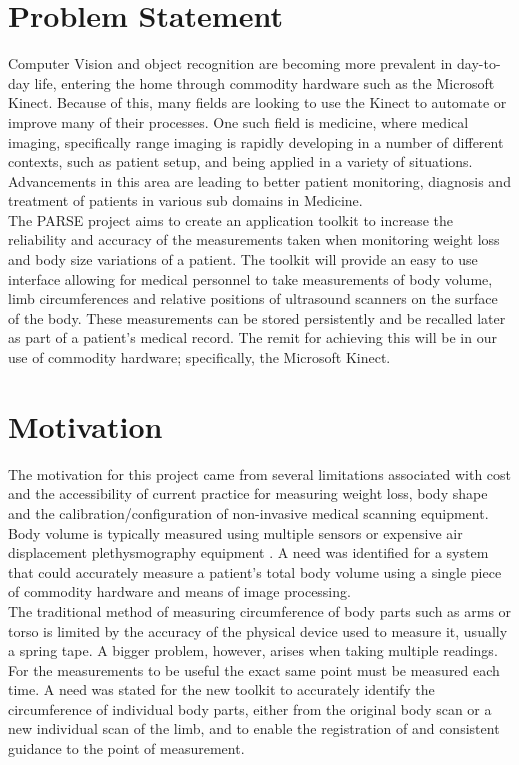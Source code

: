 \section{Problem Statement}
\label{spec: problem statement}
Computer Vision and object recognition are becoming more prevalent in day-to-day life, entering the home through commodity hardware such as the Microsoft Kinect. Because of this, many fields are looking to use the Kinect to automate or improve many of their processes. One such field is medicine, where medical imaging, specifically range imaging is rapidly developing in a number of different contexts, such as patient setup, and being applied in a variety of situations. Advancements in this area are leading to better patient monitoring, diagnosis and treatment of patients in various sub domains in Medicine.\\  

The PARSE project aims to create an application toolkit to increase the reliability and accuracy of the measurements taken when monitoring weight loss and body size variations of a patient. The toolkit will provide an easy to use interface allowing for medical personnel to take measurements of body volume, limb circumferences and relative positions of ultrasound scanners on the surface of the body. These measurements can be stored persistently and be recalled later as part of a patient’s medical record. The remit for achieving this will be in our use of commodity hardware; specifically, the Microsoft Kinect.\\ 

\section{Motivation}
\label{spec:motivation}
The motivation for this project came from several limitations associated with cost and the accessibility of current practice for measuring weight loss, body shape and the calibration/configuration of non-invasive medical scanning equipment. Body volume is typically measured using multiple sensors \cite{Bauer2011} or expensive air displacement plethysmography equipment \cite{Izadi2011}. A need was identified for a system that could accurately measure a patient's total body volume using a single piece of commodity hardware and means of image processing.\\ 

The traditional method of measuring circumference of body parts such as arms or torso is limited by the accuracy of the physical device used to measure it, usually a spring tape. A bigger problem, however, arises when taking multiple readings. For the measurements to be useful the exact same point must be measured each time. A need was stated for the new toolkit to accurately identify the circumference of individual body parts, either from the original body scan or a new individual scan of the limb, and to enable the registration of and consistent guidance to the point of measurement.\\ 

